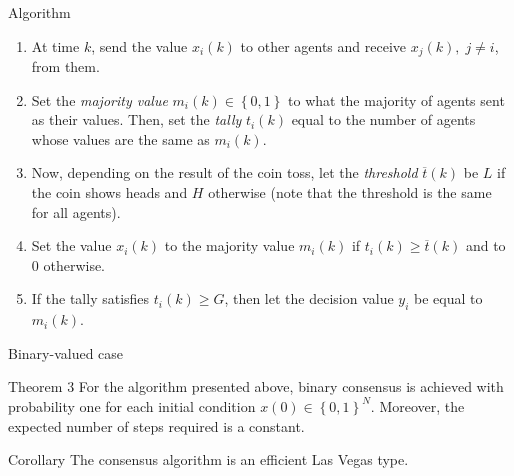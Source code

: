 \documentclass[xcolor={dvipsnames}]{beamer}
\begin{document}
	\begin{frame}{Algorithm}
		\begin{enumerate}[label=\arabic*)]
			\item At time $k$, send the value $x_{i}(k)$ to other agents and
			receive $x_{j}(k), \; j\neq i$, from them.
			
			\item Set the \textit{majority value} $m_{i}(k)\in \left\{ 0,1 \right\}$ to what the
			majority of agents sent as their values. Then, set the
			\textit{tally} $t_{i}(k)$ equal to the number of agents whose values
			are the same as $m_{i}(k)$.
			
			\item Now, depending on the result of the coin toss, let the
			\textit{threshold} $\overline{t}(k)$ be $L$ if the coin shows heads and $H$
			otherwise (note that the threshold is the same for all
			agents).
			
			\item Set the value $x_{i}(k)$ to the majority value $m_{i}(k)$ if
			$t_{i}(k) \ge \overline{t}(k)$ and to 0 otherwise.
			
			\item If the tally satisfies $t_{i}(k) \ge G$, then let the decision
			value $y_{i}$ be equal to $m_{i}(k)$.
		\end{enumerate}
	\end{frame}
	
	\begin{frame}{Binary-valued case}
		\begin{block}{Theorem 3}
			For the algorithm presented above, binary
			consensus is achieved with probability one for each initial
			condition $x(0) \in \left\{ 0,1 \right\}^{N}$. Moreover, the expected number of steps required is a constant.
		\end{block}
		
		\begin{alertblock}{Corollary}
			The consensus algorithm is an efficient Las Vegas type.
		\end{alertblock}
		
	\end{frame}
	
\end{document}
